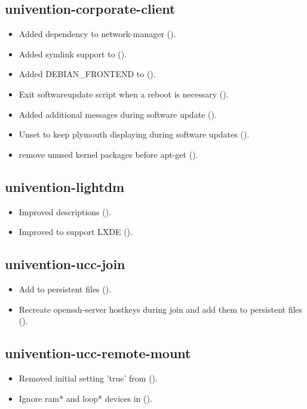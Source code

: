 \subsection{univention-corporate-client}
\begin{itemize}
\item Added dependency to network-manager ().
\item Added symlink support to  ().
\item Added DEBIAN\_FRONTEND to  ().
\item Exit softwareupdate script when a reboot is necessary ().
\item Added additional messages during software update ().
\item Unset  to keep plymouth displaying during software updates ().
\item remove unused kernel packages before apt-get ().
\end{itemize}

\subsection{univention-lightdm}
\begin{itemize}
\item Improved \ucsUCRV{}descriptions ().
\item Improved  to support LXDE ().
\end{itemize}

\subsection{univention-ucc-join}
\begin{itemize}
\item Add  to persistent files ().
\item Recreate openssh-server hostkeys during join and add them to persistent files ().
\end{itemize}

\subsection{univention-ucc-remote-mount}
\begin{itemize}
\item Removed initial setting 'true' from  ().
\item Ignore ram* and loop* devices in ().
\end{itemize}

